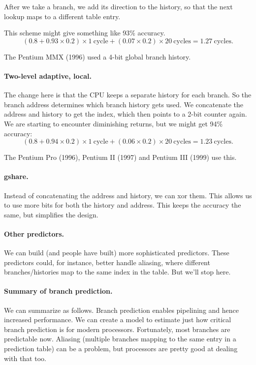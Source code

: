 \documentclass[a4paper]{report}
\begin{document}
After we take a branch, we add its direction to the history, so that the next lookup
maps to a different table entry.

This scheme might give something like 93\% accuracy.
\[
(0.8 + 0.93 \times 0.2) \times 1 \mathrm{~cycle} + (0.07 \times 0.2) \times 20 \mathrm{~cycles} = 1.27 \mathrm{~cycles}.
\]

The Pentium MMX (1996) used a 4-bit global branch history.

\paragraph{Two-level adaptive, local.}
The change here is that the CPU keeps a separate history for each branch.
So the branch address determines which branch history gets used.
We concatenate the address and history to get the index, which then points to a
2-bit counter again. We are starting to encounter diminishing returns, but we might
get 94\% accuracy:
\[
(0.8 + 0.94 \times 0.2) \times 1 \mathrm{~cycle} + (0.06 \times 0.2) \times 20 \mathrm{~cycles} = 1.23 \mathrm{~cycles}.
\]

The Pentium Pro (1996), Pentium II (1997) and Pentium III (1999) use this.

\paragraph{gshare.}
Instead of concatenating the address and history, we can xor them. This allows
us to use more bits for both the history and address. This keeps the accuracy the same,
but simplifies the design.

\paragraph{Other predictors.} We can build (and people have built) more sophisticated predictors.
These predictors could, for instance, better handle aliasing, where
different branches/histories map to the same index in the table. But we'll stop here.

\paragraph{Summary of branch prediction.} We can summarize as follows.
Branch prediction enables pipelining and hence increased performance.
We can create a model to estimate just how critical branch prediction
is for modern processors. Fortunately, most branches are predictable
now. Aliasing (multiple branches mapping to the same entry in a
prediction table) can be a problem, but processors are pretty good at
dealing with that too.
\end{document}
